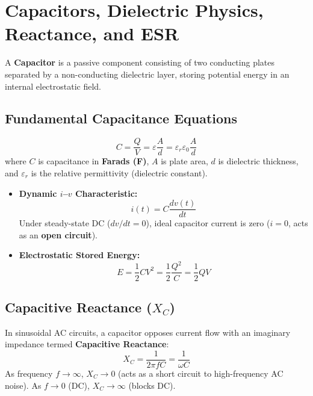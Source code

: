 \section{Capacitors, Dielectric Physics, Reactance, and ESR}
\label{sec:capacitors}

A \textbf{Capacitor} is a passive component consisting of two conducting plates separated by a non-conducting dielectric layer, storing potential energy in an internal electrostatic field.

\subsection{Fundamental Capacitance Equations}
\begin{equation}
\label{eq:capacitance_def}
\boxed{C = \frac{Q}{V} = \varepsilon \frac{A}{d} = \varepsilon_r \varepsilon_0 \frac{A}{d}}
\end{equation}
where $C$ is capacitance in \textbf{Farads (F)}, $A$ is plate area, $d$ is dielectric thickness, and $\varepsilon_r$ is the relative permittivity (dielectric constant).
\begin{itemize}
    \item \textbf{Dynamic $i$--$v$ Characteristic:}
    \begin{equation}
    \label{eq:capacitor_iv}
    \boxed{i(t) = C \frac{dv(t)}{dt}}
    \end{equation}
    Under steady-state DC ($dv/dt = 0$), ideal capacitor current is zero ($i = 0$, acts as an \textbf{open circuit}).
    \item \textbf{Electrostatic Stored Energy:}
    \begin{equation}
    \label{eq:capacitor_energy}
    \boxed{E = \frac{1}{2} C V^2 = \frac{1}{2} \frac{Q^2}{C} = \frac{1}{2} Q V}
    \end{equation}
\end{itemize}

\subsection{Capacitive Reactance ($X_C$)}
In sinusoidal AC circuits, a capacitor opposes current flow with an imaginary impedance termed \textbf{Capacitive Reactance}:
\begin{equation}
\label{eq:capacitive_reactance}
\boxed{X_C = \frac{1}{2\pi f C} = \frac{1}{\omega C}}
\end{equation}
As frequency $f \to \infty$, $X_C \to 0$ (acts as a short circuit to high-frequency AC noise). As $f \to 0$ (DC), $X_C \to \infty$ (blocks DC).

